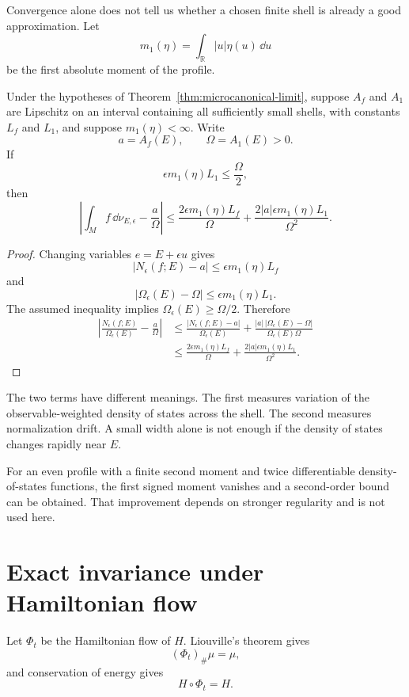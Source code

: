 \documentclass[11pt]{article}
\begin{document}
Convergence alone does not tell us whether a chosen finite shell is already a
good approximation. Let
\[
m_1(\eta)
=
\int_{\mathbb R}|u|\eta(u)\,\dd u
\]
be the first absolute moment of the profile.

\begin{theorem}
\label{thm:bias}
Under the hypotheses of Theorem~\ref{thm:microcanonical-limit}, suppose
\(A_f\) and \(A_1\) are Lipschitz on an interval containing all sufficiently
small shells, with constants \(L_f\) and \(L_1\), and suppose
\(m_1(\eta)<\infty\). Write
\[
a=A_f(E),
\qquad
\Omega=A_1(E)>0.
\]
If
\[
\epsilon m_1(\eta)L_1\leq\frac{\Omega}{2},
\]
then
\[
\left|
\int_M f\,\dd\nu_{E,\epsilon}
-\frac{a}{\Omega}
\right|
\leq
\frac{2\epsilon m_1(\eta)L_f}{\Omega}
+
\frac{2|a|\epsilon m_1(\eta)L_1}{\Omega^2}.
\]
\end{theorem}

\begin{proof}
Changing variables \(e=E+\epsilon u\) gives
\[
|N_\epsilon(f;E)-a|
\leq
\epsilon m_1(\eta)L_f
\]
and
\[
|\Omega_\epsilon(E)-\Omega|
\leq
\epsilon m_1(\eta)L_1.
\]
The assumed inequality implies
\(\Omega_\epsilon(E)\geq\Omega/2\). Therefore
\begin{align*}
\left|
\frac{N_\epsilon(f;E)}{\Omega_\epsilon(E)}
-\frac{a}{\Omega}
\right|
&\leq
\frac{|N_\epsilon(f;E)-a|}{\Omega_\epsilon(E)}
+
\frac{|a|\,|\Omega_\epsilon(E)-\Omega|}
{\Omega_\epsilon(E)\Omega}\\
&\leq
\frac{2\epsilon m_1(\eta)L_f}{\Omega}
+
\frac{2|a|\epsilon m_1(\eta)L_1}{\Omega^2}.
\end{align*}
\end{proof}

The two terms have different meanings. The first measures variation of the
observable-weighted density of states across the shell. The second measures
normalization drift. A small width alone is not enough if the density of states
changes rapidly near \(E\).

For an even profile with a finite second moment and twice differentiable
density-of-states functions, the first signed moment vanishes and a
second-order bound can be obtained. That improvement depends on stronger
regularity and is not used here.

\section{Exact invariance under Hamiltonian flow}

Let \(\Phi_t\) be the Hamiltonian flow of \(H\). Liouville's theorem gives
\[
(\Phi_t)_\#\mu=\mu,
\]
and conservation of energy gives
\[
H\circ\Phi_t=H.
\]
\end{document}
